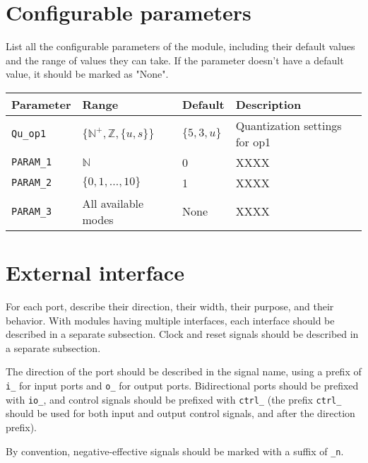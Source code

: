 \documentclass[a4paper, oneside]{report}
\begin{document}
        \section{Configurable parameters}
            List all the configurable parameters of the module, including their default values and the range of values they can take. If the parameter doesn't have a default value, it should be marked as "None".
            \begin{longtable}{llll}
                \toprule
                \textbf{Parameter}  & \textbf{Range}  & \textbf{Default} & \textbf{Description} \\
                \midrule
                \texttt{Qu\_op1}    & $\{\mathbb{N}^{+}, \mathbb{Z}, \{u, s\}\}$        & $\{5, 3, u\}$     & Quantization settings for op1\\
                \texttt{PARAM\_1}   & $\mathbb{N}$                                      & 0     & XXXX            \\
                \texttt{PARAM\_2}   & $\{0, 1, \dots, 10\}$                             & 1    & XXXX             \\
                \texttt{PARAM\_3}   & All available modes                               & None  & XXXX            \\
                \bottomrule
            \end{longtable}
        \section{External interface}
            For each port, describe their direction, their width, their purpose, and their behavior. With modules having multiple interfaces, each interface should be described in a separate subsection. Clock and reset signals should be described in a separate subsection.
            
            The direction of the port should be described in the signal name, using a prefix of \texttt{i\_} for input ports and \texttt{o\_} for output ports. Bidirectional ports should be prefixed with \texttt{io\_}, and control signals should be prefixed with \texttt{ctrl\_} (the prefix \texttt{ctrl\_} should be used for both input and output control signals, and after the direction prefix).

            By convention, negative-effective signals should be marked with a suffix of \texttt{\_n}.
\end{document}
